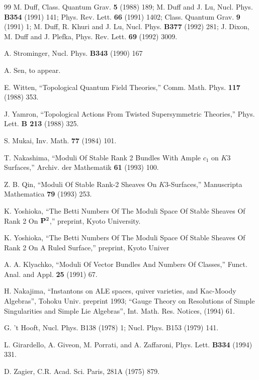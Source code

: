 \documentclass[12pt]{article}
\numberwithin{equation}{section}
\begin{document}
\begin{thebibliography}{99}
  M. Duff, Class. Quantum Grav. {\bf 5} (1988) 189; M. Duff and J.
  Lu, Nucl. Phys. {\bf B354} (1991) 141; Phys. Rev. Lett. {\bf 66}
  (1991) 1402; Class. Quantum Grav. {\bf 9} (1991) 1; M. Duff, R.
  Khuri and J. Lu, Nucl. Phys. {\bf B377} (1992) 281; J. Dixon, M.
  Duff and J. Plefka, Phys. Rev. Lett. {\bf 69} (1992) 3009.

  A. Strominger, Nucl. Phys. {\bf B343} (1990) 167

  A. Sen, to appear.

  E. Witten, ``{Topological Quantum Field Theories},'' Comm. Math.
  Phys. {\bf 117} (1988) 353.

  J. Yamron, ``{Topological Actions From Twisted Supersymmetric
  Theories},'' Phys. Lett. {\bf B 213} (1988) 325.

  S. Mukai, Inv. Math. {\bf 77} (1984) 101.

  T. Nakashima, ``Moduli Of Stable Rank 2 Bundles With Ample $c_1$ on
  $K3$ Surfaces,'' Archiv. der Mathematik {\bf 61} (1993) 100.

  Z. B. Qin, ``Moduli Of Stable Rank-2 Sheaves On $K3$-Surfaces,''
  Manuscripta Mathematica {\bf 79} (1993) 253.

  K. Yoshioka, ``The Betti Numbers Of The Moduli Space Of Stable
  Sheaves Of Rank 2 On ${\bf P}^2$,'' preprint, Kyoto University.

  K. Yoshioka, ``The Betti Numbers Of The Moduli Space Of Stable
  Sheaves Of Rank 2 On  A Ruled Surface,'' preprint, Kyoto Univer

  A. A. Klyachko,  ``Moduli Of Vector Bundles And Numbers Of
  Classes,'' Funct. Anal. and Appl. {\bf 25} (1991) 67.

  H. Nakajima, ``Instantons on ALE spaces, quiver varieties, and
  Kac-Moody Algebras'', Tohoku Univ. preprint 1993; ``Gauge Theory on
  Resolutions of Simple Singularities and Simple Lie Algebras'', Int.
  Math. Res. Notices,  (1994) 61.

  G. 't Hooft, Nucl. Phys. B138 (1978) 1; Nucl. Phys. B153 (1979) 141.

  L. Girardello, A. Giveon, M. Porrati, and A. Zaffaroni, Phys. Lett.
  {\bf B334} (1994) 331.

  D. Zagier, C.R. Acad. Sci. Paris, 281A (1975) 879.


\end{thebibliography}
\end{document}
